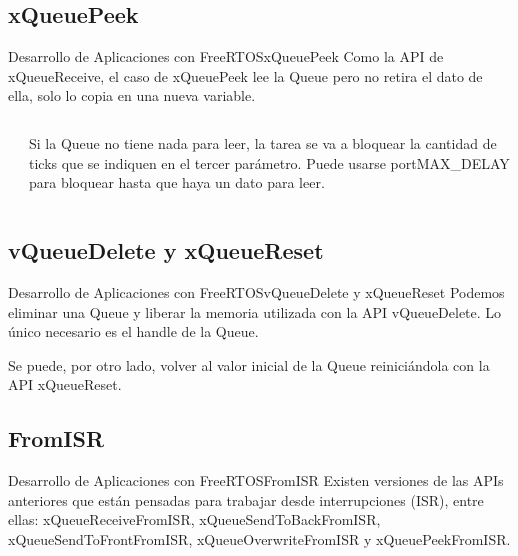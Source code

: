 \documentclass[aspectratio=169, xcolor=dvipsnames]{beamer}
\begin{document}
\subsection{xQueuePeek}
\begin{frame}{Desarrollo de Aplicaciones con FreeRTOS}{xQueuePeek}
Como la API de xQueueReceive, el caso de \textcolor{myblue}{xQueuePeek} lee la Queue pero no retira el dato de ella, solo lo copia en una nueva variable.\newline
\begin{columns}
\begin{column}{0.5\textwidth}

\end{column}
\begin{column}{0.5\textwidth}
Si la Queue no tiene nada para leer, la tarea se va a bloquear la cantidad de ticks que se indiquen en el tercer parámetro. Puede usarse \textcolor{myblue}{portMAX\_DELAY} para bloquear hasta que haya un dato para leer.
\end{column}
\end{columns}
\end{frame}

\subsection{vQueueDelete y xQueueReset}
\begin{frame}{Desarrollo de Aplicaciones con FreeRTOS}{vQueueDelete y xQueueReset}
Podemos eliminar una Queue y liberar la memoria utilizada con la API \textcolor{myblue}{vQueueDelete}. Lo único necesario es el handle de la Queue.\newline

Se puede, por otro lado, volver al valor inicial de la Queue reiniciándola con la API \textcolor{myblue}{xQueueReset}.\newline

\end{frame}

\subsection{FromISR}
\begin{frame}{Desarrollo de Aplicaciones con FreeRTOS}{FromISR}
Existen versiones de las APIs anteriores que están pensadas para trabajar desde interrupciones (ISR), entre ellas: \textcolor{myblue}{xQueueReceiveFromISR}, \textcolor{myblue}{xQueueSendToBackFromISR}, \textcolor{myblue}{xQueueSendToFrontFromISR}, \textcolor{myblue}{xQueueOverwriteFromISR} y \textcolor{myblue}{xQueuePeekFromISR}.\newline

\end{frame}
\end{document}
